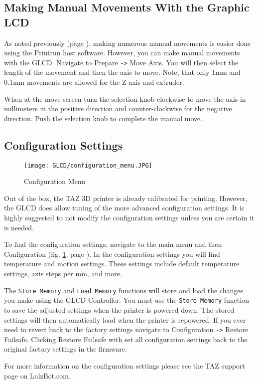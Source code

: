 \subsection{Making Manual Movements With the Graphic LCD}
As noted previously (page \pageref{sec:Graphic LCD or Printrun Host?}), making numerous manual movements is easier done using the Printrun host software. However, you can make manual movements with the GLCD. Navigate to Prepare \texttt{->} Move Axis. You will then select the length of the movement and then the axis to move. Note, that only 1mm and 0.1mm movements are allowed for the Z axis and extruder.

When at the move screen turn the selection knob clockwise to move the axis in millimeters in the positive direction and counter-clockwise for the negative direction. Push the selection knob to complete the manual move.

\subsection{Configuration Settings}

\begin{figure}[H]
\centering
\texttt{[image: GLCD/configuration\_menu.JPG]}
\caption{Configuration Menu}
\label{fig:configuration_menu}
\end{figure}

Out of the box, the TAZ 3D printer is already calibrated for printing. However, the GLCD does allow tuning of the more advanced configuration settings. It is highly suggested to not modify the configuration settings unless you are certain it is needed.

To find the configuration settings, navigate to the main menu and then Configuration (fig. \ref{fig:configuration_menu}, page \pageref{fig:configuration_menu}). In the configuration settings you will find temperature and motion settings. These settings include default temperature settings, axis steps per mm, and more.

The \texttt{Store Memory} and \texttt{Load Memory} functions will store and load the changes you make using the GLCD Controller. You must use the \texttt{Store Memory} function to save the adjusted settings when the printer is powered down. The stored settings will then automatically load when the printer is repowered. If you ever need to revert back to the factory settings navigate to Configuration \texttt{->} Restore Failsafe. Clicking Restore Failsafe with set all configuration settings back to the original factory settings in the firmware.

For more information on the configuration settings please see the TAZ support page on LulzBot.com.




